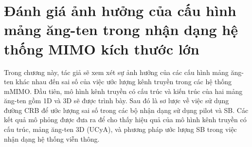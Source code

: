 \clearpage
{}

\setcounter{chapter}{1}
\chapter[{ĐÁNH GIÁ ẢNH HƯỞNG CỦA CẤU HÌNH MẢNG ĂNG-TEN TRONG NHẬN DẠNG HỆ THỐNG MIMO KÍCH THƯỚC LỚN}]{Đánh giá ảnh hưởng của cấu hình mảng ăng-ten trong nhận dạng hệ thống MIMO kích thước lớn}
\label{sec:CRB}

Trong chương này, tác giả sẽ xem xét sự ảnh hưởng của các cấu hình mảng ăng-ten khác nhau đến sai số của việc ước lượng kênh truyền trong các hệ thống mMIMO. Đầu tiên, mô hình kênh truyền có cấu trúc và kiến trúc của hai mảng ăng-ten gồm 1D và 3D sẽ được trình bày. Sau đó là sơ lược về việc sử dụng đường CRB để ước lượng sai số trong các bộ nhận dạng sử dụng pilot và SB. Các kết quả mô phỏng được đưa ra để cho thấy hiệu quả của mô hình kênh truyền có cấu trúc, mảng ăng-ten 3D (UCyA), và phương pháp ước lượng SB trong việc nhận dạng hệ thống viễn thông.



